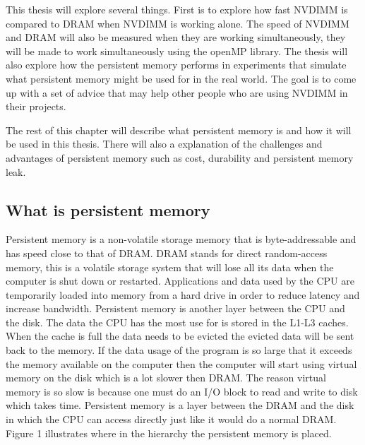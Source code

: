 \documentclass[12pt,a4paper,USenglish]{article}      %
\begin{document}

This thesis will explore several things. First is to explore how fast NVDIMM is compared to DRAM when NVDIMM is working alone. The speed of NVDIMM and DRAM will also be measured when they are working simultaneously, they will be made to work simultaneously using the openMP library.
The thesis will also explore how the persistent memory performs in experiments that simulate what persistent memory might be used for in the real world. The goal is to come up with a set of advice that may help other people who are using NVDIMM in their projects.

The rest of this chapter will describe what persistent memory is and how it will be used in this thesis. There will also a explanation of the challenges and advantages of persistent memory such as cost, durability and persistent memory leak.

\subsection{What is persistent memory}
Persistent memory\cite{Rudoff2} is a non-volatile storage memory\cite{Mahmut} that is byte-addressable and has speed close to that of DRAM. DRAM stands for direct random-access memory, this is a volatile storage system that will lose all its data when the computer is shut down or restarted. Applications and data used by the CPU are temporarily loaded into memory from a hard drive in order to reduce latency and increase bandwidth. Persistent memory is another layer between the CPU and the disk. The data the CPU has the most use for is stored in the L1-L3 caches. When the cache is full the data needs to be evicted the evicted data will be sent back to the memory. If the data usage of the program is so large that it exceeds the memory available on the computer then the computer will start using virtual memory on the disk which is a lot slower then DRAM. The reason virtual memory is so slow is because one must do an I/O block to read and write to disk which takes time. Persistent memory is a layer between the DRAM and the disk in which the CPU can access directly just like it would do a normal DRAM. Figure 1 illustrates where in the hierarchy the persistent memory is placed.
\end{document}
